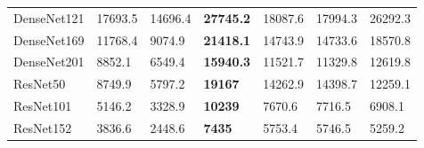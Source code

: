 \begin{table}
\begin{tabular}{lllllll}
    DenseNet121 & 17693.5   & 14696.4      & \textbf{27745.2} & 18087.6 & 17994.3 & 26292.3 \\
    DenseNet169 & 11768.4   & 9074.9       & \textbf{21418.1} & 14743.9 & 14733.6 & 18570.8 \\
    DenseNet201 & 8852.1    & 6549.4       & \textbf{15940.3} & 11521.7 & 11329.8 & 12619.8 \\
    ResNet50    & 8749.9    & 5797.2       & \textbf{19167}   & 14262.9 & 14398.7 & 12259.1 \\
    ResNet101   & 5146.2    & 3328.9       & \textbf{10239}   & 7670.6  & 7716.5  & 6908.1  \\
    ResNet152   & 3836.6    & 2448.6       & \textbf{7435}    & 5753.4  & 5746.5  & 5259.2  \\
    \end{tabular}
    \label{tbl:pap_hvd_beluga_full}
\end{table}